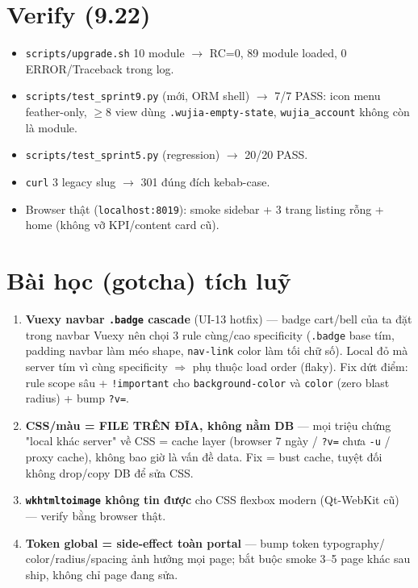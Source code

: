 \section{Verify (9.22)}

\begin{itemize}[leftmargin=*]
    \item \texttt{scripts/upgrade.sh} 10 module \(\rightarrow\) RC=0, 89 module loaded,
          0 ERROR/Traceback trong log.
    \item \texttt{scripts/test\_sprint9.py} (mới, ORM shell) \(\rightarrow\) 7/7 PASS:
          icon menu feather-only, \(\geq\)8 view dùng \texttt{.wujia-empty-state},
          \texttt{wujia\_account} không còn là module.
    \item \texttt{scripts/test\_sprint5.py} (regression) \(\rightarrow\) 20/20 PASS.
    \item \texttt{curl} 3 legacy slug \(\rightarrow\) 301 đúng đích kebab-case.
    \item Browser thật (\texttt{localhost:8019}): smoke sidebar + 3 trang listing rỗng
          + home (không vỡ KPI/content card cũ).
\end{itemize}

\section{Bài học (gotcha) tích luỹ}

\begin{enumerate}[leftmargin=*]
    \item \textbf{Vuexy navbar \texttt{.badge} cascade} (UI-13 hotfix) --- badge cart/bell
          của ta đặt trong navbar Vuexy nên chọi 3 rule cùng/cao specificity
          (\texttt{.badge} base tím, padding navbar làm méo shape, \texttt{nav-link}
          color làm tối chữ số). Local đỏ mà server tím vì cùng specificity \(\Rightarrow\)
          phụ thuộc load order (flaky). Fix dứt điểm: rule scope sâu +
          \texttt{!important} cho \texttt{background-color} và \texttt{color} (zero
          blast radius) + bump \texttt{?v=}.
    \item \textbf{CSS/màu = FILE TRÊN ĐĨA, không nằm DB} --- mọi triệu chứng "local
          khác server" về CSS = cache layer (browser 7 ngày / \texttt{?v=} chưa
          \texttt{-u} / proxy cache), không bao giờ là vấn đề data. Fix = bust cache,
          tuyệt đối không drop/copy DB để sửa CSS.
    \item \textbf{\texttt{wkhtmltoimage} không tin được} cho CSS flexbox modern
          (Qt-WebKit cũ) --- verify bằng browser thật.
    \item \textbf{Token global = side-effect toàn portal} --- bump token typography/
          color/radius/spacing ảnh hưởng mọi page; bắt buộc smoke 3--5 page khác sau
          ship, không chỉ page đang sửa.
\end{enumerate}

